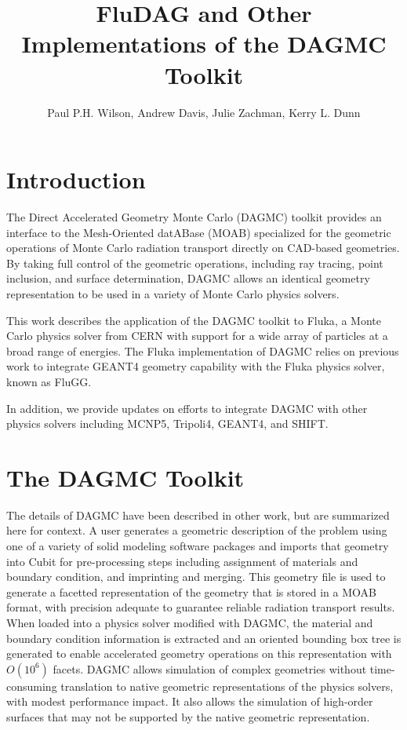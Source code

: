 \documentclass{anstrans}
\title{FluDAG and Other Implementations of the DAGMC Toolkit}
\author{Paul P.H. Wilson, Andrew Davis, Julie Zachman, Kerry L. Dunn}
\institute{University of Wisconsin-Madison, 1500 Engineering Dr,
  Madison, WI 53706}
\begin{document}
\section{Introduction}

The Direct Accelerated Geometry Monte Carlo (DAGMC) toolkit provides
an interface to the Mesh-Oriented datABase (MOAB) specialized for the
geometric operations of Monte Carlo radiation transport directly on
CAD-based geometries.  By taking full control of the geometric
operations, including ray tracing, point inclusion, and surface
determination, DAGMC allows an identical geometry representation to be
used in a variety of Monte Carlo physics solvers.

This work describes the application of the DAGMC toolkit to
Fluka\cite{fluka}, a Monte Carlo physics solver from CERN with support
for a wide array of particles at a broad range of energies.  The Fluka
implementation of DAGMC relies on previous work to integrate
GEANT4\cite{GEANT4} geometry capability with the Fluka physics solver,
known as FluGG\cite{flugg}.




In addition, we provide updates on efforts to integrate DAGMC with
other physics solvers including MCNP5\cite{mcnp5},
Tripoli4\cite{tripolo}, GEANT4, and SHIFT\cite{shift}.

\section{The DAGMC Toolkit}

The details of DAGMC have been described in other work, but are
summarized here for context.  A user generates a geometric description
of the problem using one of a variety of solid modeling software
packages and imports that geometry into Cubit\cite{cubit} for
pre-processing steps including assignment of materials and boundary
condition, and imprinting and merging.  This geometry file is used to
generate a facetted representation of the geometry that is stored in a
MOAB format, with precision adequate to guarantee reliable radiation
transport results\cite{snouffer}.  When loaded into a physics solver
modified with DAGMC, the material and boundary condition information
is extracted and an oriented bounding box tree is generated to enable
accelerated geometry operations on this representation with $O(10^6)$
facets.  DAGMC allows simulation of complex geometries without
time-consuming translation to native geometric representations of the
physics solvers, with modest performance impact.  It also allows the
simulation of high-order surfaces that may not be supported by the
native geometric representation.
\end{document}
